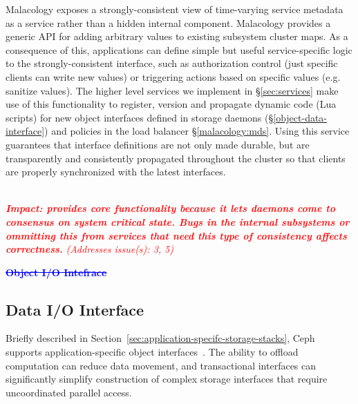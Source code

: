\documentclass[preprint]{sigplanconf-eurosys}
\newcommand{\newcomment}[1]{{\textcolor{red}{\textbf{#1}}}}
\newcommand{\oldcomment}[1]{{\textcolor{blue}{\textbf{\sout{#1}}}}}
\newcommand{\addressesissue}[1]{{\textcolor{red}{{\it (Addresses issue(s): {#1})}}}}
\begin{document}
 Malacology exposes a strongly-consistent view of
time-varying service metadata as a service rather than a hidden internal
component. Malacology provides a generic API for adding arbitrary values to
existing subsystem cluster maps. As a consequence of this, applications can
define simple but useful service-specific logic to the strongly-consistent
interface, such as authorization control (just specific clients can write new
values) or triggering actions based on specific values (e.g. sanitize values).
The higher level services we implement in \S\ref{sec:services} make use of this
functionality to register, version and propagate dynamic code (Lua scripts) for
new object interfaces defined in storage daemons (\S\ref{object-data-interface}) and
policies in the load balancer \S\ref{malacology:mds}.  Using this service
guarantees that interface definitions are not only made durable, but are
transparently and consistently propagated throughout the cluster so that
clients are properly synchronized with the latest interfaces.

\newcomment{\\ \noindent \it{\textbf{Impact: }} provides core functionality
because it lets daemons come to consensus on system critical state. Bugs in the
internal subsystems or ommitting this from services that need this type of
consistency affects correctness.}
\addressesissue{3, 5}


\oldcomment{ Object I/O Intefrace}
\subsection{Data I/O Interface}
\label{sec:data-io-interface}
\label{object-data-interface}
Briefly described in Section~\ref{sec:application-specifc-storage-stacks}, Ceph
supports application-specific object
interfaces~\cite{weil_rados_2007}. The ability to offload computation can
reduce data movement, and transactional interfaces can significantly simplify
construction of complex storage interfaces that require uncoordinated parallel
access.
\end{document}

